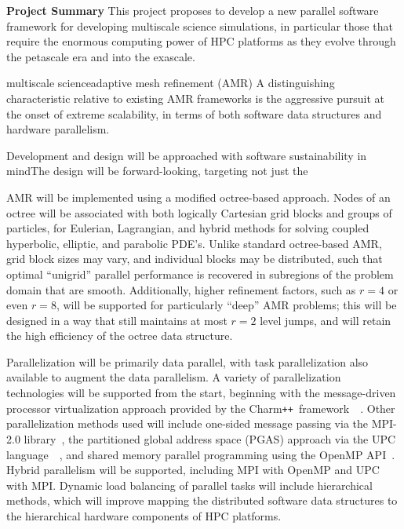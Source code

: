 \documentclass[11pt,letterpaper]{article}
\newcommand{\pp}{\texttt{++}}
\newcommand{\charm}{\textsf{Charm\pp}}
\begin{document}
\textbf{Project Summary}
%
%
%
This project proposes to develop a new parallel software framework for
developing multiscale science simulations, in particular those that
require the enormous computing power of HPC platforms as they evolve
through the petascale era and into the exascale.

 multiscale scienceadaptive
mesh refinement (AMR) 
%
A distinguishing characteristic relative to existing AMR frameworks is
the aggressive pursuit at the onset of extreme scalability, in terms
of both software data structures and hardware parallelism.
%

Development and design will be approached with software sustainability
in mindThe design will be forward-looking, targeting not just the

AMR will be implemented using a modified octree-based approach.  Nodes
of an octree will be associated with both logically Cartesian grid
blocks and groups of particles, for Eulerian, Lagrangian, and hybrid
methods for solving coupled hyperbolic, elliptic, and parabolic PDE's.
Unlike standard octree-based AMR, grid block sizes may vary, and
individual blocks may be distributed, such that optimal ``unigrid''
parallel performance is recovered in subregions of the problem domain
that are smooth.  Additionally, higher refinement factors, such as
$r=4$ or even $r=8$, will be supported for particularly ``deep'' AMR
problems; this will be designed in a way that still maintains at most
$r=2$ level jumps, and will retain the high efficiency of the octree
data structure.

Parallelization will be primarily data parallel, with task
parallelization also available to augment the data parallelism.  A
variety of parallelization technologies will be supported from the
start, beginning with the message-driven processor virtualization
approach provided by the
\charm\ framework~\cite{KaBo07}~\cite{wwwcharm}.  Other
parallelization methods used will include one-sided message passing
via the MPI-2.0 library~\cite{wwwmpi}, the partitioned global address
space (PGAS) approach via the UPC language~\cite{wwwupc}~\cite{upc},
and shared memory parallel programming using the OpenMP
API~\cite{wwwopenmp}.  Hybrid parallelism will be supported, including
MPI with OpenMP and UPC with MPI.  Dynamic load balancing of parallel
tasks will include hierarchical methods, which will improve mapping
the distributed software data structures to the hierarchical hardware
components of HPC platforms.
\end{document}

